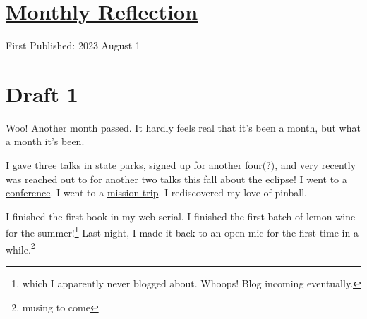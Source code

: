 \documentclass[12pt]{article}[titlepage]
\renewcommand{\,}{\textsuperscript{,}}
\begin{document}
\doublespacing
\section{\href{reflection-july-23.html}{Monthly Reflection}}
First Published: 2023 August 1

\section{Draft 1}
Woo! Another month passed.
It hardly feels real that it's been a month, but what a month it's been.

I gave \href{universe-2.html}{three} \href{universe-3.html}{talks} in state parks, signed up for another four(?), and very recently was reached out to for another two talks this fall about the eclipse!
I went to a \href{conference-2.html}{conference}.
I went to a \href{mission-trip.html}{mission trip}.
I rediscovered my love of pinball.

I finished the first book in my web serial.
I finished the first batch of lemon wine for the summer!\footnote{which I apparently never blogged about. Whoops! Blog incoming eventually.}
Last night, I made it back to an open mic for the first time in a while.\footnote{musing to come}
\end{document}
